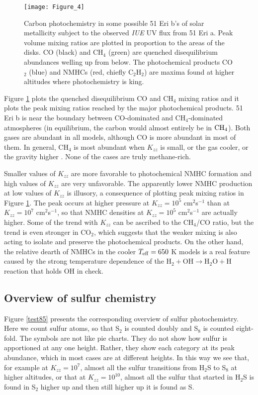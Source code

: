 \documentclass[preprint]{aastex}
\newcounter{reaction}
\begin{document}
  \begin{figure}[!htb] 
   \centering
   \texttt{[image: Figure\_4]} 
   \caption{\small Carbon photochemistry in some possible 51 Eri b's of solar metallicity 
   subject to the observed {\it IUE} {UV} flux from 51 Eri a.
   Peak volume mixing ratios are plotted in proportion to the areas of the disks.
   CO (black) and CH$_4$ (green) are quenched disequilibrium abundances welling up from below. 
  The photochemical products CO$_2$ (blue) and NMHCs (red, chiefly C$_2$H$_2$) are maxima found at higher altitudes where
   photochemistry is king. 
 }
\label{test95}
\end{figure}

Figure \ref{test95} plots the quenched disequilibrium CO and CH$_4$ mixing ratios
and it plots the peak mixing ratios reached by the major photochemical products. 
 51 Eri b is near the boundary between CO-dominated and CH$_4$-dominated atmospheres (in equilibrium, the carbon
 would almost entirely be in ${\rm CH}_4$).
Both gases are abundant in all models, although CO is more abundant in most of them.
In general, CH$_4$ is most abundant when $K_{zz}$ is small, or the gas cooler, or the gravity higher \citep{Zahnle2014}.
None of the cases are truly methane-rich.

Smaller values of $K_{zz}$ are more favorable to photochemical NMHC formation
and high values of $K_{zz}$ are very unfavorable.
 The apparently lower NMHC production at low values of $K_{zz}$ is illusory,
   a consequence of plotting peak mixing ratios in Figure \ref{test95}.
   The peak occurs at higher pressure at $K_{zz}=10^5$ cm$^2$s$^{-1}$ than
   at $K_{zz}=10^7$ cm$^2$s$^{-1}$, so that NMHC densities at $K_{zz}=10^5$ cm$^2$s$^{-1}$ are actually higher. 
   Some of the trend with $K_{zz}$ can be ascribed to the CH$_4$/CO ratio, but the trend is even stronger in CO$_2$,
   which suggests that the weaker mixing is also acting to isolate and preserve the photochemical products.
   On the other hand, the relative dearth of NMHCs in the cooler $T_{\rm eff}=650$ K models is a real feature
   caused by the strong temperature dependence of the 
   $\mathrm{H}_2 + \mathrm{OH} \rightarrow \mathrm{H}_2\mathrm{O}+\mathrm{H}$ reaction that holds OH in check.


\subsection{Overview of sulfur chemistry}

Figure \ref{test85} presents the corresponding overview of sulfur photochemistry.
Here we count sulfur atoms, so that S$_2$ is counted doubly and
    S$_8$ is counted eight-fold.  The symbols are not like pie charts.
    They do not show how sulfur is apportioned at any one height.
    Rather, they show each category at its peak abundance, which in most cases are at different heights.
    In this way we see that, for example at $K_{zz}=10^7$, almost all the sulfur transitions from H$_2$S to S$_8$ at higher altitudes,
    or that at $K_{zz}=10^{10}$, almost all the sulfur that started in H$_2$S is found in S$_2$ higher up
    and then still higher up it is found as S. 
\end{document}
